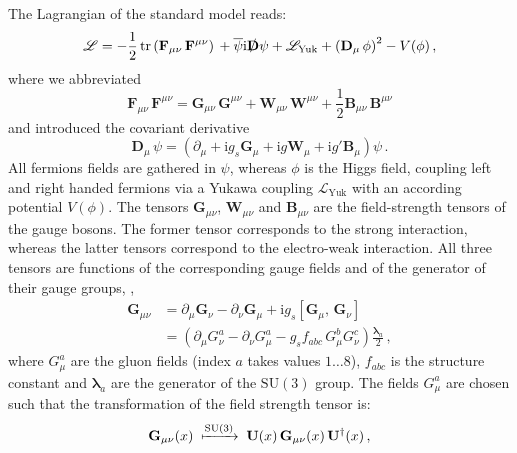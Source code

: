 The Lagrangian of the standard model reads:
\begin{equation*}
  \mathscr{L} = -\frac{1}{2} \operatorname{tr} \left( \mathbf{F}_{\mu\nu} \, \mathbf{F}^{\mu\nu} \right) \\
  + \overline{\psi} \mathrm{i} \slashed{\mathbf{D}} \psi + \mathscr{L}_\text{Yuk} + \left( \mathbf{D}_\mu \, \phi \right)^2 - V(\phi) \,,
\end{equation*}
where we abbreviated 
\begin{equation*}
  \mathbf{F}_{\mu\nu} \, \mathbf{F}^{\mu\nu} = \mathbf{G}_{\mu\nu} \, \mathbf{G}^{\mu\nu} + \mathbf{W}_{\mu\nu} \, \mathbf{W}^{\mu\nu} + \frac{1}{2} \mathbf{B}_{\mu\nu} \, \mathbf{B}^{\mu\nu}
\end{equation*}
and introduced the covariant derivative
\begin{equation*}
  \mathbf{D}_\mu \, \psi = \left( \partial_\mu + \mathrm{i} g_s \mathbf{G}_\mu + \mathrm{i} g \mathbf{W}_\mu + \mathrm{i} g' \mathbf{B}_\mu \right) \psi \,.
\end{equation*}
All fermions fields are gathered in $\psi$, whereas $\phi$ is the Higgs field, coupling left and right handed fermions via a Yukawa coupling $\mathscr{L}_\text{Yuk}$ with an according potential $V(\phi)$.
The tensors $\mathbf{G}_{\mu\nu}$, $\mathbf{W}_{\mu\nu}$ and $\mathbf{B}_{\mu\nu}$ are the field-strength tensors of the gauge bosons.
The former tensor corresponds to the strong interaction, whereas the latter tensors correspond to the electro-weak interaction.
All three tensors are functions of the corresponding gauge fields and of the generator of their gauge groups, \eg{},
\begin{align*}
  \mathbf{G}_{\mu\nu} &= \partial_\mu \mathbf{G}_\nu - \partial_\nu \mathbf{G}_\mu + \mathrm{i} g_s \left[ \mathbf{G}_\mu,\,\mathbf{G}_\nu \right] \nonumber \\
  &= \left( \partial_\mu G^a_\nu - \partial_\nu G^a_\mu - g_s f_{abc} \, G_\mu^b G_\nu^c \right) \frac{\bm{\lambda}_a}{2} \,,
\end{align*}
where $G_\mu^a$ are the gluon fields (index $a$ takes values $1\ldots8$), $f_{abc}$ is the structure constant and $\bm{\lambda}_a$ are the generator of the $\mathrm{SU}(3)$ group.
The fields $G_\mu^a$ are chosen such that the transformation of the field strength tensor is:
\begin{equation*}
  \mathbf{G}_{\mu\nu}(x) \; \xmapsto{\mathrm{SU}(3)} \; \mathbf{U}(x) \, \mathbf{G}_{\mu\nu}(x) \, \mathbf{U}^\dagger(x) \,,
\end{equation*}
